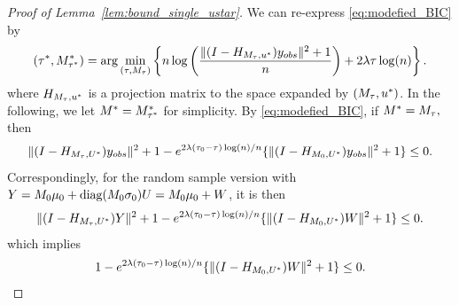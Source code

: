 \documentclass[10pt,a4paper]{amsart}
\newcommand{\diag}{\hbox{diag}}
\begin{document}
\begin{proof}[Proof of Lemma~\ref{lem:bound_single_ustar}]

We can re-express 
\eqref{eq:modefied_BIC} by 
\begin{align*}
(\tau^*, \*M^*_{\tau^*}) = \arg\min\limits_{(\tau, \*M_\tau)}   \left\{n\log \bigg(\frac{\|(\*I-\*H_{\*M_\tau, \*u^*})\*y_{obs}\|^2+1}{n}\bigg) + 2\lambda\tau\log(n)\right\}.
\end{align*}
where $\*H_{\*M_\tau, \*u^*}$ is a projection matrix to the space expanded by  $(\*M_\tau, \*u^*)$. In the following, we let $\*M^* = \*M^*_{\tau^*}$ for simplicity.  
By \eqref{eq:modefied_BIC},  if $\*M^* = \*M_{\tau},$ then
\begin{align*}
    \|(\*I - \*H_{\*M_{\tau}, \*U^*}) \*y_{obs}\|^2 + 1  - e^{2\lambda(\tau_0-\tau)\log(n)/n} \{\|(\*I - \*H_{\*M_0, \*U^*}) \*y_{obs}\|^2 +1\} \leq 0.
\end{align*} 
Correspondingly, for the random sample version with $\*Y = {\*M_0} {\*\mu_0} + \diag(\*M_0 {\*\sigma_0}) \*U = {\*M_0} {\*\mu_0} + \*W$, it  
is then
\begin{align}
\label{eq:A3_inequality1}
    \|(\*I - \*H_{\*M_{\tau}, \*U^*}) \*Y\|^2 + 1  - e^{2\lambda(\tau_0-\tau)\log(n)/n} \{\|(\*I - \*H_{\*M_0, \*U^*}) \*W\|^2 +1\} \leq 0.
\end{align} 
which implies 
\begin{align}
\label{eq:A3_inequality1a}
     1  - e^{2\lambda(\tau_0-\tau)\log(n)/n} \{\|(\*I - \*H_{\*M_0, \*U^*}) \*W\|^2+1\} \leq 0.
\end{align} 


\end{proof}
\end{document}
